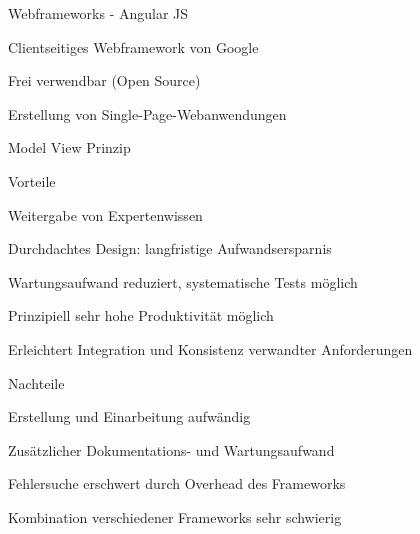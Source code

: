\documentclass[a4paper]{article}
\begin{document}
\begin{multicols}{3}
  Webframeworks - Angular JS
  \begin{itemize*}
    \item Clientseitiges Webframework von Google
    \item Frei verwendbar (Open Source)
    \item Erstellung von Single-Page-Webanwendungen
    \item Model View Prinzip
  \end{itemize*}

  \begin{itemize*}
    \item Vorteile
          \begin{itemize*}
            \item Weitergabe von Expertenwissen
            \item Durchdachtes Design: langfristige Aufwandsersparnis
            \item Wartungsaufwand reduziert, systematische Tests möglich
            \item Prinzipiell sehr hohe Produktivität möglich
            \item Erleichtert Integration und Konsistenz verwandter Anforderungen
          \end{itemize*}
    \item Nachteile
          \begin{itemize*}
            \item Erstellung und Einarbeitung aufwändig
            \item Zusätzlicher Dokumentations- und Wartungsaufwand
            \item Fehlersuche erschwert durch Overhead des Frameworks
            \item Kombination verschiedener Frameworks sehr schwierig
          \end{itemize*}
  \end{itemize*}


\end{multicols}
\end{document}
